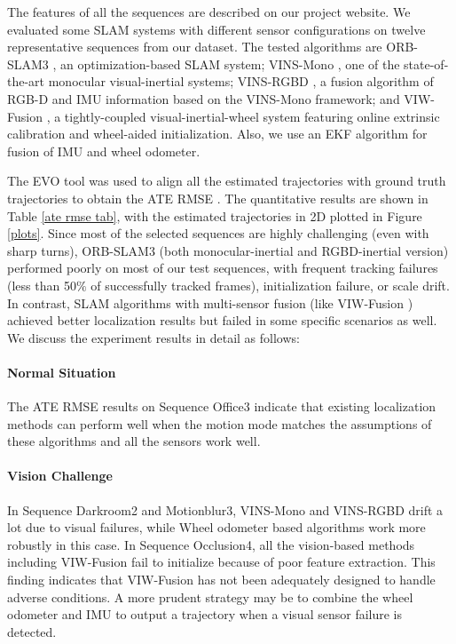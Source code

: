 \documentclass[conference]{IEEEtran}
\begin{document}
The features of all the sequences are described on our project website. We evaluated some SLAM systems with different sensor configurations on twelve representative sequences from our dataset. The tested algorithms are ORB-SLAM3 \cite{campos2021orb}, an optimization-based SLAM system; VINS-Mono \cite{qin2018vins}, one of the state-of-the-art monocular visual-inertial systems; VINS-RGBD \cite{shan2019rgbd}, a fusion algorithm of RGB-D and IMU information based on the VINS-Mono \cite{qin2018vins} framework; and VIW-Fusion \cite{Tingda2022VIW}, a tightly-coupled visual-inertial-wheel system featuring online extrinsic calibration and wheel-aided initialization. Also, we use an EKF algorithm \cite{ribeiro2004kalman} for fusion of IMU and wheel odometer.

The EVO tool \cite{MichaelGrupp2018} was used to align all the estimated trajectories with ground truth trajectories to obtain the ATE RMSE \cite{sturm2012benchmark}.
The quantitative results are shown in Table \ref{ate rmse tab}, with the estimated trajectories in 2D plotted in Figure \ref{plots}. Since most of the selected sequences are highly challenging (even with sharp turns), ORB-SLAM3 (both monocular-inertial and RGBD-inertial version) performed poorly on most of our test sequences, with frequent tracking failures (less than 50$\%$ of successfully tracked frames), initialization failure, or scale drift. 
In contrast, SLAM algorithms with multi-sensor fusion (like VIW-Fusion \cite{Tingda2022VIW}) achieved better localization results but failed in some specific scenarios as well. We discuss the experiment results in detail as follows:

\paragraph{Normal Situation} 
The ATE RMSE results on Sequence Office3 indicate that existing localization methods can perform well when the motion mode matches the assumptions of these algorithms and all the sensors work well.

\paragraph{Vision Challenge} 

In Sequence Darkroom2 and Motionblur3, VINS-Mono \cite{qin2018vins} and VINS-RGBD \cite{shan2019rgbd} drift a lot due to visual failures, while Wheel odometer based algorithms work more robustly in this case.
In Sequence Occlusion4, all the vision-based methods including VIW-Fusion \cite{Tingda2022VIW} fail to initialize because of poor feature extraction. This finding indicates that VIW-Fusion \cite{Tingda2022VIW} has not been adequately designed to handle adverse conditions. A more prudent strategy may be to combine the wheel odometer and IMU to output a trajectory when a visual sensor failure is detected.
\end{document}
